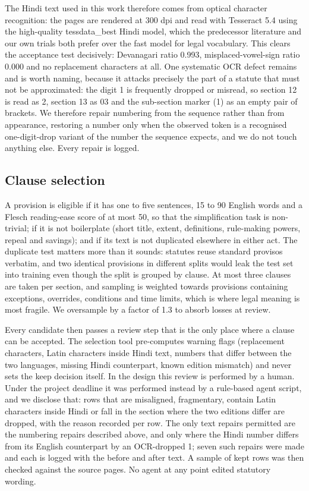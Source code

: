\documentclass[conference]{IEEEtran}
\begin{document}
The Hindi text used in this work therefore comes from optical character recognition: the pages are rendered at 300 dpi and read with Tesseract 5.4 using the high-quality tessdata\_best Hindi model, which the predecessor literature and our own trials both prefer over the fast model for legal vocabulary. This clears the acceptance test decisively: Devanagari ratio 0.993, misplaced-vowel-sign ratio 0.000 and no replacement characters at all. One systematic OCR defect remains and is worth naming, because it attacks precisely the part of a statute that must not be approximated: the digit 1 is frequently dropped or misread, so section 12 is read as 2, section 13 as 03 and the sub-section marker (1) as an empty pair of brackets. We therefore repair numbering from the sequence rather than from appearance, restoring a number only when the observed token is a recognised one-digit-drop variant of the number the sequence expects, and we do not touch anything else. Every repair is logged.

\subsection{Clause selection}

A provision is eligible if it has one to five sentences, 15 to 90 English words and a Flesch reading-ease score of at most 50, so that the simplification task is non-trivial; if it is not boilerplate (short title, extent, definitions, rule-making powers, repeal and savings); and if its text is not duplicated elsewhere in either act. The duplicate test matters more than it sounds: statutes reuse standard provisos verbatim, and two identical provisions in different splits would leak the test set into training even though the split is grouped by clause. At most three clauses are taken per section, and sampling is weighted towards provisions containing exceptions, overrides, conditions and time limits, which is where legal meaning is most fragile. We oversample by a factor of 1.3 to absorb losses at review.

Every candidate then passes a review step that is the only place where a clause can be accepted. The selection tool pre-computes warning flags (replacement characters, Latin characters inside Hindi text, numbers that differ between the two languages, missing Hindi counterpart, known edition mismatch) and never sets the keep decision itself. In the design this review is performed by a human. Under the project deadline it was performed instead by a rule-based agent script, and we disclose that: rows that are misaligned, fragmentary, contain Latin characters inside Hindi or fall in the section where the two editions differ are dropped, with the reason recorded per row. The only text repairs permitted are the numbering repairs described above, and only where the Hindi number differs from its English counterpart by an OCR-dropped 1; seven such repairs were made and each is logged with the before and after text. A sample of kept rows was then checked against the source pages. No agent at any point edited statutory wording.
\end{document}
